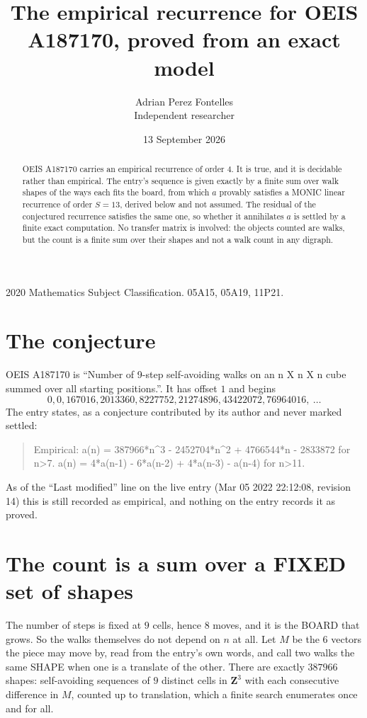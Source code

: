 \documentclass[11pt,a4paper]{article}
\title{The empirical recurrence for OEIS A187170, proved from an exact model}
\author{Adrian Perez Fontelles\\ \small Independent researcher}
\date{13 September 2026}
\theoremstyle{plain}
\theoremstyle{definition}
\begin{document}
\maketitle

\begin{abstract}
OEIS A187170 carries an empirical recurrence of order $4$. It is true, and it is
decidable rather than empirical. The entry's sequence is given exactly by a finite sum over walk shapes of the ways each fits the board, from
which $a$ provably satisfies a MONIC linear recurrence of order $S=13$, derived below and not
assumed. The residual of the conjectured recurrence satisfies the same one, so whether it
annihilates $a$ is settled by a finite exact computation. No transfer matrix is involved: the objects counted are walks, but the count is a finite sum over their shapes and not a walk count in any digraph.
\end{abstract}

\noindent\small 2020 Mathematics Subject Classification. 05A15, 05A19, 11P21.\normalsize

\section{The conjecture}

OEIS A187170 is ``Number of 9-step self-avoiding walks on an n X n X n cube summed over all starting positions.''. It has offset $1$ and begins
\[
0, 0, 167016, 2013360, 8227752, 21274896, 43422072, 76964016,\ \dots
\]
The entry states, as a conjecture contributed by its author and never marked settled:
\begin{quote}
Empirical: a(n) = 387966*n\^{}3 - 2452704*n\^{}2 + 4766544*n - 2833872 for n>7. a(n) = 4*a(n-1) - 6*a(n-2) + 4*a(n-3) - a(n-4) for n>11.
\end{quote}
As of the ``Last modified'' line on the live entry (Mar 05 2022 22:12:08, revision 14)
this is still recorded as empirical, and nothing on the entry records it as proved.

\section{The count is a sum over a FIXED set of shapes}

The number of steps is fixed at $9$ cells, hence $8$ moves, and it is the BOARD
that grows. So the walks themselves do not depend on $n$ at all. Let $M$ be the $6$
vectors the piece may move by, read from the entry's own words, and call two walks the same
SHAPE when one is a translate of the other. There are exactly $387966$ shapes: self-avoiding
sequences of $9$ distinct cells in $\mathbf{Z}^{3}$ with each consecutive difference in
$M$, counted up to translation, which a finite search enumerates once and for all.
\end{document}
